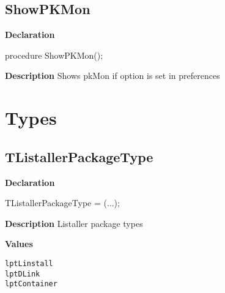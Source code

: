 \documentclass{report}
\newif\ifpdf
\begin{document}
\subsection*{ShowPKMon}
\fi
\label{common-ShowPKMon}
\begin{list}{}{
\setlength{\itemindent}{0cm}
\setlength{\listparindent}{0cm}
\setlength{\leftmargin}{\evensidemargin}
\addtolength{\leftmargin}{\tmplength}
\settowidth{\labelsep}{X}
\addtolength{\leftmargin}{\labelsep}
\setlength{\labelwidth}{\tmplength}
}
\item[\textbf{Declaration}\hfill]
\ifpdf
\begin{flushleft}
\fi
\begin{ttfamily}
procedure ShowPKMon();\end{ttfamily}

\ifpdf
\end{flushleft}
\fi

\par
\item[\textbf{Description}]
Shows pkMon if option is set in preferences

\end{list}
\section{Types}
\ifpdf
\subsection*{\large{\textbf{TListallerPackageType}}\normalsize\hspace{1ex}\hrulefill}
\else
\subsection*{TListallerPackageType}
\fi
\label{common-TListallerPackageType}
\begin{list}{}{
\setlength{\itemindent}{0cm}
\setlength{\listparindent}{0cm}
\setlength{\leftmargin}{\evensidemargin}
\addtolength{\leftmargin}{\tmplength}
\settowidth{\labelsep}{X}
\addtolength{\leftmargin}{\labelsep}
\setlength{\labelwidth}{\tmplength}
}
\item[\textbf{Declaration}\hfill]
\ifpdf
\begin{flushleft}
\fi
\begin{ttfamily}
TListallerPackageType = (...);\end{ttfamily}

\ifpdf
\end{flushleft}
\fi

\par
\item[\textbf{Description}]
Listaller package types\item[\textbf{Values}]
\begin{description}
\item[\texttt{lptLinstall}]  
\item[\texttt{lptDLink}]  
\item[\texttt{lptContainer}]  
\end{description}


\end{list}
\end{document}
